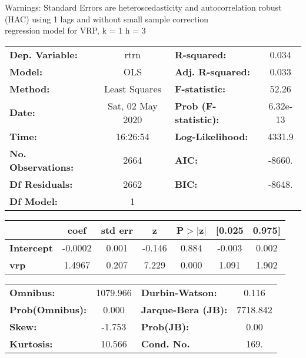 Warnings: \newline
 [1] Standard Errors are heteroscedasticity and autocorrelation robust (HAC) using 1 lags and without small sample correction\\ 

regression model for VRP, k = 1 h = 3\begin{center}
\begin{tabular}{lclc}
\toprule
\textbf{Dep. Variable:}    &       rtrn       & \textbf{  R-squared:         } &     0.034   \\
\textbf{Model:}            &       OLS        & \textbf{  Adj. R-squared:    } &     0.033   \\
\textbf{Method:}           &  Least Squares   & \textbf{  F-statistic:       } &     52.26   \\
\textbf{Date:}             & Sat, 02 May 2020 & \textbf{  Prob (F-statistic):} &  6.32e-13   \\
\textbf{Time:}             &     16:26:54     & \textbf{  Log-Likelihood:    } &    4331.9   \\
\textbf{No. Observations:} &        2664      & \textbf{  AIC:               } &    -8660.   \\
\textbf{Df Residuals:}     &        2662      & \textbf{  BIC:               } &    -8648.   \\
\textbf{Df Model:}         &           1      & \textbf{                     } &             \\
\bottomrule
\end{tabular}
\begin{tabular}{lcccccc}
                   & \textbf{coef} & \textbf{std err} & \textbf{z} & \textbf{P$> |$z$|$} & \textbf{[0.025} & \textbf{0.975]}  \\
\midrule
\textbf{Intercept} &      -0.0002  &        0.001     &    -0.146  &         0.884        &       -0.003    &        0.002     \\
\textbf{vrp}       &       1.4967  &        0.207     &     7.229  &         0.000        &        1.091    &        1.902     \\
\bottomrule
\end{tabular}
\begin{tabular}{lclc}
\textbf{Omnibus:}       & 1079.966 & \textbf{  Durbin-Watson:     } &    0.116  \\
\textbf{Prob(Omnibus):} &   0.000  & \textbf{  Jarque-Bera (JB):  } & 7718.842  \\
\textbf{Skew:}          &  -1.753  & \textbf{  Prob(JB):          } &     0.00  \\
\textbf{Kurtosis:}      &  10.566  & \textbf{  Cond. No.          } &     169.  \\
\bottomrule
\end{tabular}
\end{center}

